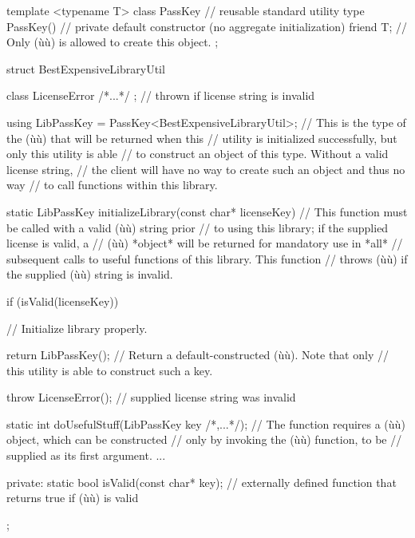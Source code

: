 \begin{emcppslisting}
template <typename T>
class PassKey  // reusable standard utility type
{
    PassKey() { }  // private default constructor (no aggregate initialization)
    friend T;      // Only (ù{}ù) is allowed to create this object.
};

struct BestExpensiveLibraryUtil
{
    class LicenseError { /*...*/ };  // thrown if license string is invalid

    using LibPassKey = PassKey<BestExpensiveLibraryUtil>;
        // This is the type of the (ù{}ù) that will be returned when this
        // utility is initialized successfully, but only this utility is able
        // to construct an object of this type. Without a valid license string,
        // the client will have no way to create such an object and thus no way
        // to call functions within this library.

    static LibPassKey initializeLibrary(const char* licenseKey)
        // This function must be called with a valid (ù{}ù) string prior
        // to using this library; if the supplied license is valid, a
        // (ù{}ù) *object* will be returned for mandatory use in *all*
        // subsequent calls to useful functions of this library. This function
        // throws (ù{}ù) if the supplied (ù{}ù) string is invalid.
    {
        if (isValid(licenseKey))
        {
            // Initialize library properly.

            return LibPassKey();
                // Return a default-constructed (ù{}ù). Note that only
                // this utility is able to construct such a key.
        }

        throw LicenseError();  // supplied license string was invalid
    }

    static int doUsefulStuff(LibPassKey key /*,...*/);
        // The function requires a (ù{}ù) object, which can be constructed
        // only by invoking the (ù{}ù) function, to be
        // supplied as its first argument. ...

private:
    static bool isValid(const char* key);
        // externally defined function that returns true if (ù{}ù) is valid
};
\end{emcppslisting}

